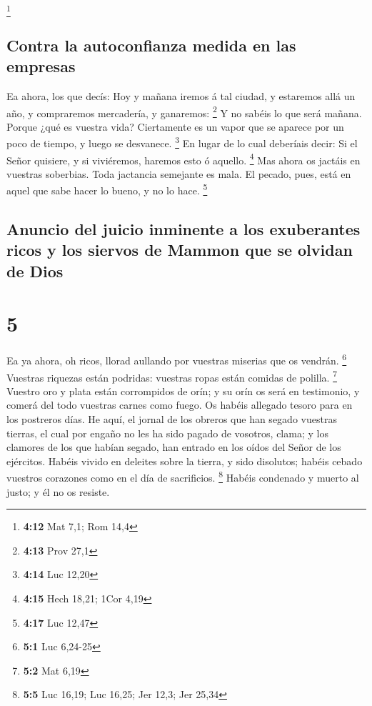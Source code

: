 \footnote{\textbf{4:12} Mat 7,1; Rom 14,4}

\hypertarget{contra-la-autoconfianza-medida-en-las-empresas}{%
\subsection{Contra la autoconfianza medida en las
empresas}\label{contra-la-autoconfianza-medida-en-las-empresas}}

 Ea ahora, los que decís: Hoy y mañana iremos á tal
ciudad, y estaremos allá un año, y compraremos mercadería, y ganaremos:
\footnote{\textbf{4:13} Prov 27,1}  Y no sabéis lo que
será mañana. Porque ¿qué es vuestra vida? Ciertamente es un vapor que se
aparece por un poco de tiempo, y luego se desvanece. \footnote{\textbf{4:14}
  Luc 12,20}  En lugar de lo cual deberíais decir: Si el
Señor quisiere, y si viviéremos, haremos esto ó aquello. \footnote{\textbf{4:15}
  Hech 18,21; 1Cor 4,19}  Mas ahora os jactáis en
vuestras soberbias. Toda jactancia semejante es mala.  El
pecado, pues, está en aquel que sabe hacer lo bueno, y no lo hace.
\footnote{\textbf{4:17} Luc 12,47}

\hypertarget{anuncio-del-juicio-inminente-a-los-exuberantes-ricos-y-los-siervos-de-mammon-que-se-olvidan-de-dios}{%
\subsection{Anuncio del juicio inminente a los exuberantes ricos y los
siervos de Mammon que se olvidan de
Dios}\label{anuncio-del-juicio-inminente-a-los-exuberantes-ricos-y-los-siervos-de-mammon-que-se-olvidan-de-dios}}

\hypertarget{section-4}{%
\section{5}\label{section-4}}

 Ea ya ahora, oh ricos, llorad aullando por vuestras
miserias que os vendrán. \footnote{\textbf{5:1} Luc 6,24-25}
 Vuestras riquezas están podridas: vuestras ropas están
comidas de polilla. \footnote{\textbf{5:2} Mat 6,19} 
Vuestro oro y plata están corrompidos de orín; y su orín os será en
testimonio, y comerá del todo vuestras carnes como fuego. Os habéis
allegado tesoro para en los postreros días.  He aquí, el
jornal de los obreros que han segado vuestras tierras, el cual por
engaño no les ha sido pagado de vosotros, clama; y los clamores de los
que habían segado, han entrado en los oídos del Señor de los ejércitos.
 Habéis vivido en deleites sobre la tierra, y sido
disolutos; habéis cebado vuestros corazones como en el día de
sacrificios. \footnote{\textbf{5:5} Luc 16,19; Luc 16,25; Jer 12,3; Jer
  25,34}  Habéis condenado y muerto al justo; y él no os
resiste.

